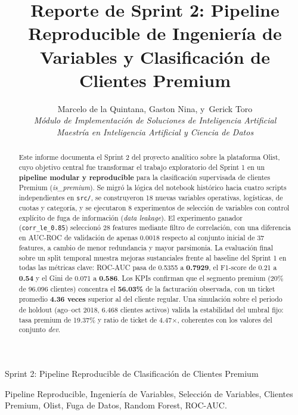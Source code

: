\documentclass[journal,letterpaper]{IEEEtran}
\begin{document}
\title{Reporte de Sprint 2: Pipeline Reproducible de Ingeniería de Variables y Clasificación de Clientes Premium}

\author{Marcelo de la Quintana,
        Gaston Nina,
        y~Gerick Toro\\
        \textit{Módulo de Implementación de Soluciones de Inteligencia Artificial}\\
        \textit{Maestría en Inteligencia Artificial y Ciencia de Datos}}

%
{Sprint 2: Pipeline Reproducible de Clasificación de Clientes Premium}

\maketitle

\begin{abstract}
Este informe documenta el Sprint 2 del proyecto analítico sobre la plataforma Olist, cuyo objetivo central fue transformar el trabajo exploratorio del Sprint 1 en un \textbf{pipeline modular y reproducible} para la clasificación supervisada de clientes Premium (\textit{is\_premium}). Se migró la lógica del notebook histórico hacia cuatro scripts independientes en \texttt{src/}, se construyeron 18 nuevas variables operativas, logísticas, de cuotas y categoría, y se ejecutaron 8 experimentos de selección de variables con control explícito de fuga de información (\textit{data leakage}). El experimento ganador (\texttt{corr\_le\_0.85}) seleccionó 28 features mediante filtro de correlación, con una diferencia en AUC-ROC de validación de apenas 0.0018 respecto al conjunto inicial de 37 features, a cambio de menor redundancia y mayor parsimonia. La evaluación final sobre un split temporal muestra mejoras sustanciales frente al baseline del Sprint 1 en todas las métricas clave: ROC-AUC pasa de 0.5355 a \textbf{0.7929}, el F1-score de 0.21 a \textbf{0.54} y el Gini de 0.071 a \textbf{0.586}. Los KPIs confirman que el segmento premium (20\% de 96.096 clientes) concentra el \textbf{56.03\%} de la facturación observada, con un ticket promedio \textbf{4.36 veces} superior al del cliente regular. Una simulación sobre el periodo de holdout (ago--oct 2018, 6.468 clientes activos) valida la estabilidad del umbral fijo: tasa premium de 19.37\% y ratio de ticket de 4.47×, coherentes con los valores del conjunto \textit{dev}.
\end{abstract}

\begin{IEEEkeywords}
Pipeline Reproducible, Ingeniería de Variables, Selección de Variables, Clientes Premium, Olist, Fuga de Datos, Random Forest, ROC-AUC.
\end{IEEEkeywords}
\end{document}
